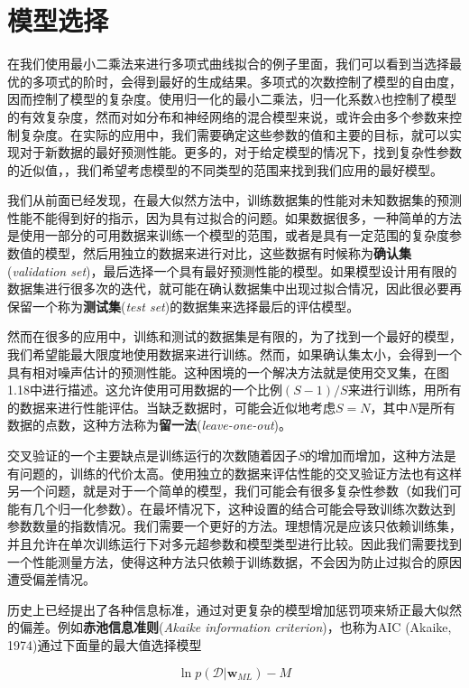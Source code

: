 \section{模型选择}
	在我们使用最小二乘法来进行多项式曲线拟合的例子里面，我们可以看到当选择最优的多项式的阶时，会得到最好的生成结果。多项式的次数控制了模型的自由度，因而控制了模型的复杂度。使用归一化的最小二乘法，归一化系数$\lambda$也控制了模型的有效复杂度，然而对如分布和神经网络的混合模型来说，或许会由多个参数来控制复杂度。在实际的应用中，我们需要确定这些参数的值和主要的目标，就可以实现对于新数据的最好预测性能。更多的，对于给定模型的情况下，找到复杂性参数的近似值，，我们希望考虑模型的不同类型的范围来找到我们应用的最好模型。
	
	我们从前面已经发现，在最大似然方法中，训练数据集的性能对未知数据集的预测性能不能得到好的指示，因为具有过拟合的问题。如果数据很多，一种简单的方法是使用一部分的可用数据来训练一个模型的范围，或者是具有一定范围的复杂度参数值的模型，然后用独立的数据来进行对比，这些数据有时候称为\textbf{确认集}(\textit{validation set})，最后选择一个具有最好预测性能的模型。如果模型设计用有限的数据集进行很多次的迭代，就可能在确认数据集中出现过拟合情况，因此很必要再保留一个称为\textbf{测试集}(\textit{test set})的数据集来选择最后的评估模型。
	
	然而在很多的应用中，训练和测试的数据集是有限的，为了找到一个最好的模型，我们希望能最大限度地使用数据来进行训练。然而，如果确认集太小，会得到一个具有相对噪声估计的预测性能。这种困境的一个解决方法就是使用交叉集，在图1.18中进行描述。这允许使用可用数据的一个比例$(S - 1)/S$来进行训练，用所有的数据来进行性能评估。当缺乏数据时，可能会近似地考虑$S = N$，其中\textit{N}是所有数据的点数，这种方法称为\textbf{留一法}(\textit{leave-one-out})。
	
	交叉验证的一个主要缺点是训练运行的次数随着因子\textit{S}的增加而增加，这种方法是有问题的，训练的代价太高。使用独立的数据来评估性能的交叉验证方法也有这样另一个问题，就是对于一个简单的模型，我们可能会有很多复杂性参数（如我们可能有几个归一化参数）。在最坏情况下，这种设置的结合可能会导致训练次数达到参数数量的指数情况。我们需要一个更好的方法。理想情况是应该只依赖训练集，并且允许在单次训练运行下对多元超参数和模型类型进行比较。因此我们需要找到一个性能测量方法，使得这种方法只依赖于训练数据，不会因为防止过拟合的原因遭受偏差情况。
	
	历史上已经提出了各种信息标准，通过对更复杂的模型增加惩罚项来矫正最大似然的偏差。例如\textbf{赤池信息准则}(\textit{Akaike information criterion})，也称为AIC (Akaike, 1974)通过下面量的最大值选择模型
	
	\begin{equation}
	\ln p(\mathcal{D}| \textbf{w}_{ML}) - M
	\end{equation}
	

